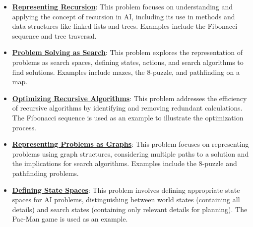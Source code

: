 \documentclass{article}%
\begin{document}
\begin{itemize}[leftmargin=*]%
\item \href{https://www.math.purdue.edu/~yipn/351/14L1-DepthFS.pdf#page=3}{\textbf{Representing Recursion}}: This problem focuses on understanding and applying the concept of recursion in AI, including its use in methods and data structures like linked lists and trees. Examples include the Fibonacci sequence and tree traversal.%
\item \href{https://www.math.purdue.edu/~yipn/351/14L1-DepthFS.pdf#page=12}{\textbf{Problem Solving as Search}}: This problem explores the representation of problems as search spaces, defining states, actions, and search algorithms to find solutions. Examples include mazes, the 8-puzzle, and pathfinding on a map.%
\item \href{https://www.math.purdue.edu/~yipn/351/14L1-DepthFS.pdf#page=21}{\textbf{Optimizing Recursive Algorithms}}: This problem addresses the efficiency of recursive algorithms by identifying and removing redundant calculations. The Fibonacci sequence is used as an example to illustrate the optimization process.%
\item \href{https://www.math.purdue.edu/~yipn/351/14L1-DepthFS.pdf#page=25}{\textbf{Representing Problems as Graphs}}: This problem focuses on representing problems using graph structures, considering multiple paths to a solution and the implications for search algorithms. Examples include the 8-puzzle and pathfinding problems.%
\item \href{https://www.math.purdue.edu/~yipn/351/14L1-DepthFS.pdf#page=37}{\textbf{Defining State Spaces}}: This problem involves defining appropriate state spaces for AI problems, distinguishing between world states (containing all details) and search states (containing only relevant details for planning). The Pac-Man game is used as an example.%
\end{itemize}%
\end{document}
